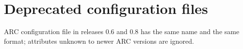 % 
% 
% 
% 


\section{Deprecated configuration files}

ARC configuration file in releases 0.6 and 0.8 has the same name and the same
format; attributes unknown to newer ARC versions are ignored.

